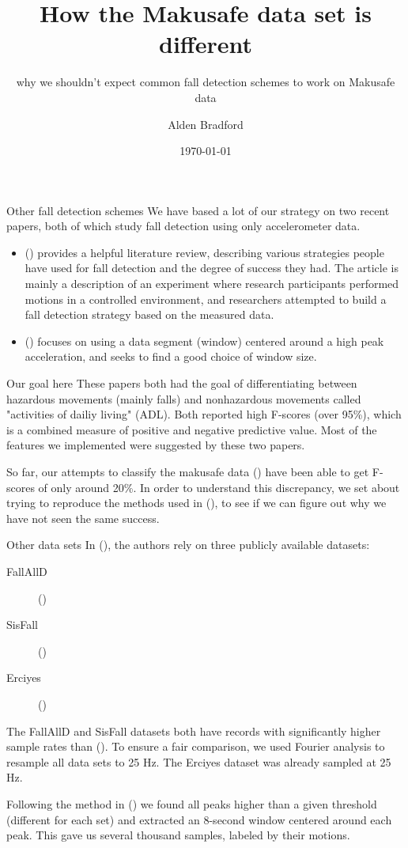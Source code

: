 \documentclass{beamer}
\title{How the Makusafe data set is different}
\subtitle{why we shouldn't expect common fall detection schemes to work on Makusafe data}
\author{Alden Bradford}
\institute{Purdue University / The Data Mine}
\date{\today}
\begin{document}
\begin{frame}
\titlepage
\end{frame}

\begin{frame}{Other fall detection schemes}
We have based a lot of our strategy on two recent papers, both of which study fall detection using only accelerometer data.
\begin{itemize}
\item (\cite{althobaiti2020triaxial}) provides a helpful literature review, describing various strategies people have used for fall detection and the degree of success they had. The article is mainly a description of an experiment where research participants performed motions in a controlled environment, and researchers attempted to build a fall detection strategy based on the measured data.
\item (\cite{vseketa2021event}) focuses on using a data segment (window) centered around a high peak acceleration, and seeks to find a good choice of window size.
\end{itemize}
\end{frame}

\begin{frame}{Our goal here}
These papers both had the goal of differentiating between hazardous movements (mainly falls) and nonhazardous movements called "activities of dailiy living" (ADL). Both reported high F-scores (over 95\%), which is a combined measure of positive and negative predictive value. Most of the features we implemented were suggested by these two papers.

So far, our attempts to classify the makusafe data (\cite{makusafe}) have been able to get F-scores of only around 20\%. In order to understand this discrepancy, we set about trying to reproduce the methods used in (\cite{vseketa2021event}), to see if we can figure out why we have not seen the same success.
\end{frame}

\begin{frame}{Other data sets}
In (\cite{vseketa2021event}), the authors rely on three publicly available datasets:
\begin{description}
\item[FallAllD] (\cite{bnya-mn34-20})
\item[SisFall] (\cite{sucerquia2017sisfall})
\item[Erciyes] (\cite{ozdemir2014detecting})
\end{description}
The FallAllD and SisFall datasets both have records with significantly higher sample rates than (\cite{makusafe}). To ensure a fair comparison, we used Fourier analysis to resample all data sets to 25 Hz. The Erciyes dataset was already sampled at 25 Hz.

Following the method in (\cite{vseketa2021event}) we found all peaks higher than a given threshold (different for each set) and extracted an 8-second window centered around each peak. This gave us several thousand samples, labeled by their motions.
\end{frame}
\end{document}
